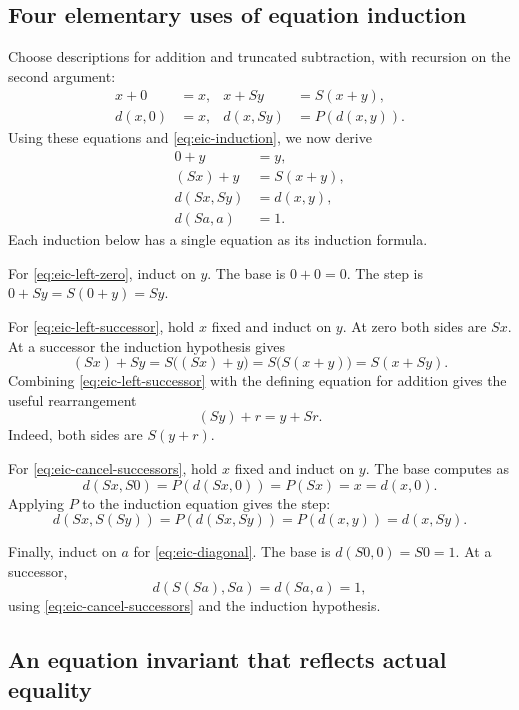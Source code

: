 \documentclass[11pt,letterpaper]{article}
\theoremstyle{definition}\newtheorem{definition}[theorem]{Definition}
\theoremstyle{remark}\newtheorem{remark}[theorem]{Remark}
\begin{document}
\subsection{Four elementary uses of equation induction}

Choose descriptions for addition and truncated subtraction, with recursion
on the second argument:
\begin{align}
 x+0&=x, &x+Sy&=S(x+y),\label{eq:eic-addition}\\
 d(x,0)&=x, &d(x,Sy)&=P(d(x,y)).\label{eq:eic-subtraction}
\end{align}
Using these equations and \eqref{eq:eic-induction}, we now derive
\begin{align}
 0+y&=y,\label{eq:eic-left-zero}\\
 (Sx)+y&=S(x+y),\label{eq:eic-left-successor}\\
 d(Sx,Sy)&=d(x,y),\label{eq:eic-cancel-successors}\\
 d(Sa,a)&=1.\label{eq:eic-diagonal}
\end{align}
Each induction below has a single equation as its induction formula.

For \eqref{eq:eic-left-zero}, induct on $y$.  The base is $0+0=0$.
The step is $0+Sy=S(0+y)=Sy$.

For \eqref{eq:eic-left-successor}, hold $x$ fixed and induct on $y$.
At zero both sides are $Sx$.  At a successor the induction hypothesis
gives
\[
 (Sx)+Sy=S\bigl((Sx)+y\bigr)
       =S\bigl(S(x+y)\bigr)=S(x+Sy).
\]
Combining \eqref{eq:eic-left-successor} with the defining equation for
addition gives the useful rearrangement
\begin{equation}
 (Sy)+r=y+Sr.
 \label{eq:eic-shift-successor}
\end{equation}
Indeed, both sides are $S(y+r)$.

For \eqref{eq:eic-cancel-successors}, hold $x$ fixed and induct on $y$.
The base computes as
\[
 d(Sx,S0)=P(d(Sx,0))=P(Sx)=x=d(x,0).
\]
Applying $P$ to the induction equation gives the step:
\[
 d(Sx,S(Sy))=P(d(Sx,Sy))=P(d(x,y))=d(x,Sy).
\]

Finally, induct on $a$ for \eqref{eq:eic-diagonal}.  The base is
$d(S0,0)=S0=1$.  At a successor,
\[
 d(S(Sa),Sa)=d(Sa,a)=1,
\]
using \eqref{eq:eic-cancel-successors} and the induction hypothesis.

\subsection{An equation invariant that reflects actual equality}
\end{document}
